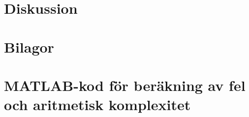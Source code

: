 \documentclass[a4paper,titlepage]{article}
\begin{document}
\section{Diskussion}



\section*{Bilagor}
\appendix

\section{MATLAB-kod för beräkning av fel och aritmetisk komplexitet}
\label{sec:testcode}
\end{document}
